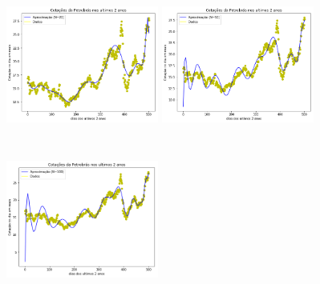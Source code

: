 \documentclass{article}
\begin{document}
\begin{figure}[!htb]
\includegraphics [width=5cm,height=5cm]{Gauss/G20.png}
\includegraphics [width=5cm,height=5cm]{Gauss/G50.png}
\includegraphics [width=5cm,height=5cm]{Gauss/G100.png}
\end{figure}

\newpage
\end{document}
